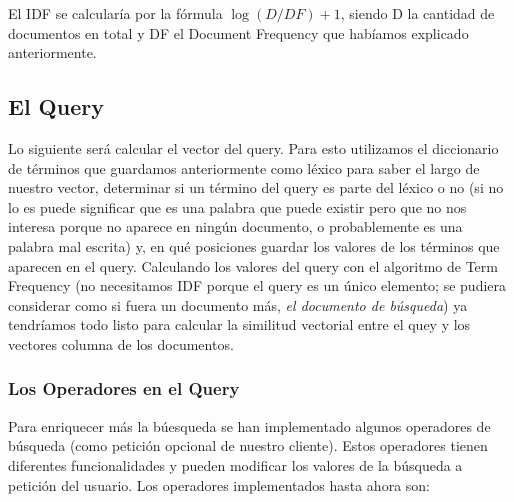 \documentclass[12pt]{article}
\begin{document}
	El IDF se calcularía por la fórmula $\log(D/DF)+1$, siendo D la cantidad de documentos en total y DF el Document Frequency que habíamos explicado anteriormente.
	 
\subsection*{El Query}
	Lo siguiente será calcular el vector del query.
	Para esto utilizamos el diccionario de términos que guardamos anteriormente como léxico para saber el largo de nuestro vector, determinar si un término del query es parte del léxico o no (si no lo es puede significar que es una palabra que puede existir pero que no nos interesa porque no aparece en ningún documento, o probablemente es una palabra mal escrita) y, en qué posiciones guardar los valores de los términos que aparecen en el query.
	Calculando los valores del query con el algoritmo de Term Frequency (no necesitamos IDF porque el query es un único elemento; se pudiera considerar como si fuera un documento más, \textit{el documento de búsqueda}) ya tendríamos todo listo para calcular la similitud vectorial entre el quey y los vectores columna de los documentos.
	
\subsubsection*{Los Operadores en el Query}
	Para enriquecer más la búesqueda se han implementado algunos operadores de búsqueda  (como petición opcional de nuestro cliente).
	Estos operadores tienen diferentes funcionalidades y pueden modificar los valores de la búsqueda a petición del usuario.
	Los operadores implementados hasta ahora son:
	
\end{document}
